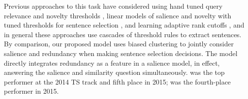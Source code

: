 Previous approaches to this task have considered using hand tuned 
query relevance and novelty thresholds \citep{xu2013hltcoe}, linear models of 
salience and novelty with tuned thresholds for sentence selection
\citep{guo2013updating}, and learning adaptive rank cutoffs 
\citep{mccreadie2014incremental,mccreadie2015university}, and in general
these approaches use cascades of threshold rules to extract sentences.
By comparison, our proposed \sap{} model uses biased clustering to jointly 
consider salience and redundancy when making sentence selection decisions.
The \modelLS{} model directly integrates redundancy as a feature in a 
salience model,
in effect, answering the salience and similarity question simultaneously. 
\sap{} was the top performer at the 2014 TS track and fifth place in 2015;
\modelLS{} was the fourth-place performer in 2015.





